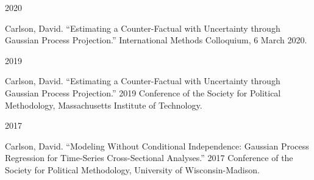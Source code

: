 \documentclass[12pt]{article}
\begin{document}
\vspace{10pt}

\begin{minipage}[t]{.15\textwidth}
2020\\
\end{minipage}
\begin{minipage}[t]{.8\textwidth}
\FlushLeft
Carlson, David. ``Estimating a Counter-Factual with Uncertainty through Gaussian Process Projection.'' International Methods Colloquium, 6 March 2020.\\
\end{minipage}
\vspace{.5cm}



\begin{minipage}[t]{.15\textwidth}
2019\\%
\end{minipage}
\begin{minipage}[t]{.8\textwidth}
\FlushLeft
Carlson, David. ``Estimating a Counter-Factual with Uncertainty through Gaussian Process Projection.'' 2019 Conference of the Society for Political Methodology, Massachusetts Institute of Technology.\\
\end{minipage}
\vspace{.5cm}

\begin{minipage}[t]{.15\textwidth}
2017\\%
\end{minipage}
\begin{minipage}[t]{.8\textwidth}
\FlushLeft
Carlson, David. ``Modeling Without Conditional Independence: Gaussian Process Regression for Time-Series Cross-Sectional Analyses.'' 2017 Conference of the Society for Political Methodology, University of Wisconsin-Madison.\\
\end{minipage}
\vspace{.5cm}
\end{document}

